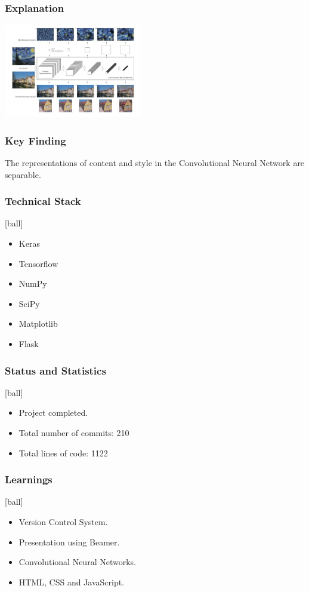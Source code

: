 \documentclass[14pt]{beamer}
\begin{document}
\begin{frame}
    \frametitle{Explanation}
    \begin{center}
        \includegraphics[width=60mm]{exp.jpg}
    \end{center}
\end{frame}

\begin{frame}
		\frametitle{Key Finding}
		The representations of content and style in the Convolutional Neural Network are separable.
\end{frame}

\begin{frame}
		\frametitle{Technical Stack}
		\begin{itemize}
		\item Keras 
        \item Tensorflow
		\item NumPy
		\item SciPy
        \item Matplotlib
		\item Flask  
		\end{itemize}
\end{frame}

\begin{frame}
		\frametitle{Status and Statistics}
		\begin{itemize}
		\item Project completed.
		\item Total number of commits: 210
        \item Total lines of code: 1122
		\end{itemize}
\end{frame}

\begin{frame}
		\frametitle{Learnings}
        \begin{itemize}
		\item Version Control System.
		\item Presentation using Beamer.
		\item Convolutional Neural Networks.
        \item HTML, CSS and JavaScript.
		\end{itemize}
\end{frame}
\end{document}

